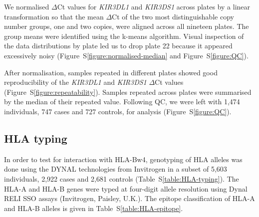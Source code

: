 

We normalised $\Delta$Ct values for \emph{KIR3DL1} and \emph{KIR3DS1} across plates by a linear transformation so that
the mean $\Delta$Ct of the two most distinguishable copy number groups, one and two copies, were aligned across all nineteen plates.
The group means were identified using the k-means algorithm.
Visual inspection of the data distributions by plate led us to drop plate 22 because it appeared excessively noisy (Figure~S\ref{figure:normalised-median} and Figure~S\ref{figure:QC}).


After normalisation, samples repeated in different plates showed good reproducibility of the \emph{KIR3DL1} and \emph{KIR3DS1} $\Delta$Ct values (Figure~S\ref{figure:repeatability}).
Samples repeated across plates were summarised by the median of their repeated value.
Following QC, we were left with 1,474 individuals, 747 cases and 727 controls, for analysis (Figure~S\ref{figure:QC}).


\subsection*{HLA typing}

In order to test for interaction with HLA-Bw4,
genotyping of HLA alleles was done using the DYNAL technologies from Invitrogen in a subset of 5,603 individuals,  2,922 cases and 2,681 controls (Table~S\ref{table:HLA-typing}).
The HLA-A and HLA-B genes were typed at four-digit allele resolution using Dynal RELI SSO assays (Invitrogen, Paisley, U.K.).
The epitope classification of HLA-A and HLA-B alleles is given in Table~S\ref{table:HLA-epitope}.


